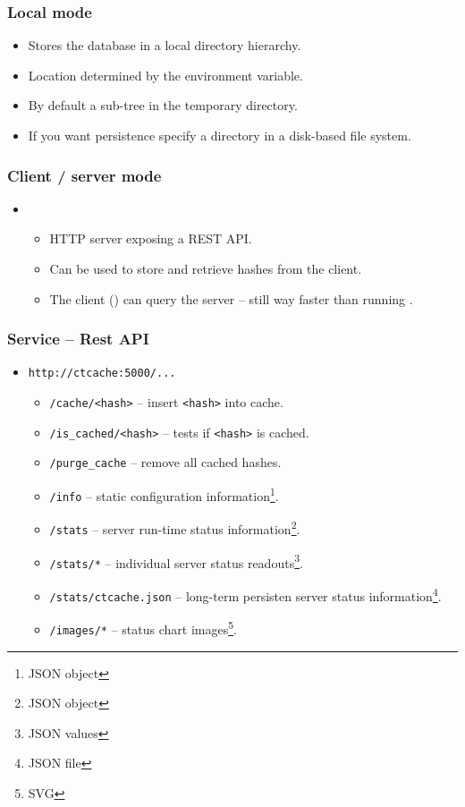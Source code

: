 \documentclass[compress,table,xcolor=table]{beamer}
\begin{document}
\begin{frame}
    \frametitle{Local mode}
    \LARGE
    \begin{itemize}
        \item Stores the database in a local directory hierarchy.
        \item Location determined by the  environment
            variable.
        \item By default a sub-tree in the temporary directory.
        \item If you want persistence specify a directory in
            a disk-based file system.
    \end{itemize}
\end{frame}
\begin{frame}
    \frametitle{Client / server mode}
    \LARGE
    \begin{itemize}
        \item {}
        \begin{itemize}
            \Large
            \item HTTP server exposing a REST API.
            \item Can be used to store and retrieve hashes from the client.
            \item The client () can query
                the server -- still {\larger way} faster than running
                .
        \end{itemize}
    \end{itemize}
\end{frame}
\begin{frame}[fragile]
  \frametitle{Service -- Rest API}
    \large
    \begin{itemize}
    \item \texttt{http://ctcache:5000/...}
    \begin{itemize}
    \normalsize
    \item \texttt{/cache/<hash>} -- insert \texttt{<hash>} into cache.
    \item \texttt{/is\_cached/<hash>} -- tests if \texttt{<hash>} is cached.
    \item \texttt{/purge\_cache} -- remove all cached hashes.
    \item \texttt{/info} -- static configuration information\footnote{JSON object}.
    \item \texttt{/stats} -- server run-time status information\footnote{JSON object}.
    \item \texttt{/stats/*} -- individual server status readouts\footnote{JSON values}.
    \item \texttt{/stats/ctcache.json} -- long-term persisten server status information\footnote{JSON file}.
    \item \texttt{/images/*} -- status chart images\footnote{SVG}.
    \end{itemize}
    \end{itemize}
\end{frame}
\end{document}

